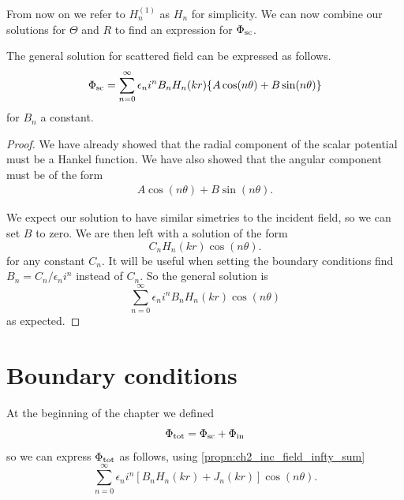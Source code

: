From now on we refer to $H^{(1)}_n$ as $H_n$ for simplicity.
We can now combine our solutions for $\Theta$ and $R$ to find an expression for $\Phi_{\text{sc}}$.

\begin{propn}\label{eq:gen_sol_scatterin_outside_cylinder}
  The general solution for scattered field can be expressed as follows.
    \begin{equation} \label{eq:ch2_gen_eq_scattered_field}
        \Phi_{\text{sc}} = \sum^\infty_{n=0} \epsilon_n i^n B_n H_n(kr) \{A\cos(n\theta) + B \sin(n\theta)\}
    \end{equation}
  for $B_n$ a constant.
\end{propn}
\begin{proof}
  We have already showed that the radial component of the scalar potential must be a Hankel function. We have also showed that the angular component must be of the form
    \begin{align*}
      A \cos(n\theta) + B \sin(n \theta).
    \end{align*}

  We expect our solution to have similar simetries to the incident field, so we can set $B$ to zero. We are then left with a solution of the form
    \begin{equation}
      C_n H_n(kr) \cos(n\theta).
    \end{equation}
  for any constant $C_n$. It will be useful when setting the boundary conditions find $ B_n = C_n/\epsilon_n i^n$ instead of $C_n$. So the general solution is
  \begin{equation}
    \sum^\infty_{n=0} \epsilon_n i^n B_n H_n(kr) \cos(n\theta)
  \end{equation}
  as expected.
\end{proof}


\section{Boundary conditions}

At the beginning of the chapter we defined
  \[ \Phi_{\text{tot}} = \Phi_{\text{sc}} + \Phi_{\text{in}} \]
so we can express $\Phi_{\text{tot}}$ as follows, using \eqref{propn:ch2_inc_field_infty_sum}
\begin{equation}
  \sum^\infty_{n=0} \epsilon_n i^n [B_n H_n(kr) + J_n(kr)] \cos(n\theta).
\end{equation}

